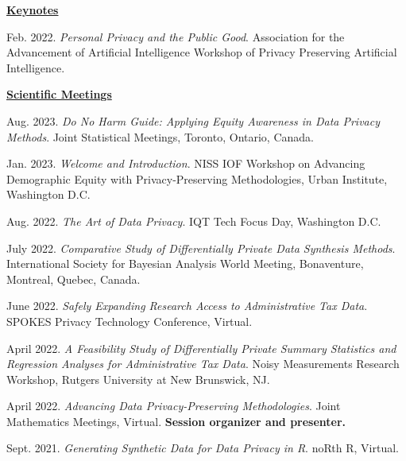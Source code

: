 \underline{\textbf{\large Keynotes}}\normalsize
\vspace{6pt}
\begin{etaremune}[topsep=0pt, itemsep=5pt, partopsep=0pt, parsep=0pt]
    \item Feb. 2022. \textit{Personal Privacy and the Public Good}. Association for the Advancement of Artificial Intelligence Workshop of Privacy Preserving Artificial Intelligence.
    
\vspace{6pt}
\hspace{-0.30in}\underline{\textbf{\large Scientific Meetings}}\normalsize
    \item Aug. 2023. \textit{Do No Harm Guide: Applying Equity Awareness in Data Privacy Methods}. Joint Statistical Meetings, Toronto, Ontario, Canada.
    
    \item Jan. 2023. \textit{Welcome and Introduction}. NISS IOF Workshop on Advancing Demographic Equity with Privacy-Preserving Methodologies, Urban Institute, Washington D.C.
    
    \item Aug. 2022. \textit{The Art of Data Privacy}. IQT Tech Focus Day, Washington D.C.
    
    \item July 2022. \textit{Comparative Study of Differentially Private Data Synthesis Methods}. International Society for Bayesian Analysis World Meeting, Bonaventure, Montreal, Quebec, Canada.
    
    \item June 2022. \textit{Safely Expanding Research Access to Administrative Tax Data}. SPOKES Privacy Technology Conference, Virtual.
    
    \item April 2022. \textit{A Feasibility Study of Differentially Private Summary Statistics and Regression Analyses for Administrative Tax Data}. Noisy Measurements Research Workshop, Rutgers University at New Brunswick, NJ.
    
    \item April 2022. \textit{Advancing Data Privacy-Preserving Methodologies}. Joint Mathematics Meetings, Virtual. \textbf{Session organizer and presenter.}

    \item Sept. 2021. \textit{Generating Synthetic Data for Data Privacy in R}. noRth R, Virtual.


\end{etaremune}
